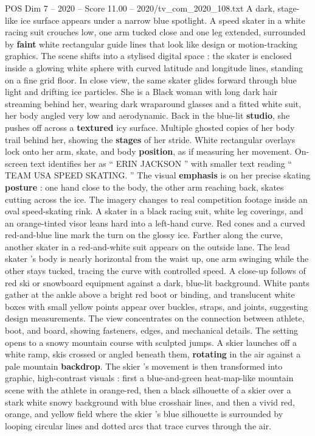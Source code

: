 \begin{textsample}{POS Dim 7 – 2020 – Score 11.00 – 2020/tv\_com\_2020\_108.txt}  \label{ex:f7_pos_081}
A dark, stage-like ice surface appears under a narrow blue spotlight.
A speed skater in a white racing suit crouches low, one arm tucked close and one leg extended, surrounded by \textbf{faint} white rectangular guide lines that look like design or motion-tracking graphics.
The scene shifts into a stylised digital space : the skater is enclosed inside a glowing white sphere with curved latitude and longitude lines, standing on a fine grid floor.
In close view, the same skater glides forward through blue light and drifting ice particles.
She is a Black woman with long dark hair streaming behind her, wearing dark wraparound glasses and a fitted white suit, her body angled very low and aerodynamic.
Back in the blue-lit \textbf{studio}, she pushes off across a \textbf{textured} icy surface.
Multiple ghosted copies of her body trail behind her, showing the \textbf{stages} of her stride.
White rectangular overlays lock onto her arm, skate, and body \textbf{position}, as if measuring her movement.
On-screen text identifies her as “ ERIN JACKSON ” with smaller text reading “ TEAM USA SPEED SKATING. ” The visual \textbf{emphasis} is on her precise skating \textbf{posture} : one hand close to the body, the other arm reaching back, skates cutting across the ice.
The imagery changes to real competition footage inside an oval speed-skating rink.
A skater in a black racing suit, white leg coverings, and an orange-tinted visor leans hard into a left-hand curve.
Red cones and a curved red-and-blue line mark the turn on the glossy ice.
Farther along the curve, another skater in a red-and-white suit appears on the outside lane.
The lead skater ’s body is nearly horizontal from the waist up, one arm swinging while the other stays tucked, tracing the curve with controlled speed.
A close-up follows of red ski or snowboard equipment against a dark, blue-lit background.
White pants gather at the ankle above a bright red boot or binding, and translucent white boxes with small yellow points appear over buckles, straps, and joints, suggesting design measurements.
The view concentrates on the connection between athlete, boot, and board, showing fasteners, edges, and mechanical details.
The setting opens to a snowy mountain course with sculpted jumps.
A skier launches off a white ramp, skis crossed or angled beneath them, \textbf{rotating} in the air against a pale mountain \textbf{backdrop}.
The skier ’s movement is then transformed into graphic, high-contrast visuals : first a blue-and-green heat-map-like mountain scene with the athlete in orange-red, then a black silhouette of a skier over a stark white snowy background with blue crosshair lines, and then a vivid red, orange, and yellow field where the skier ’s blue silhouette is surrounded by looping circular lines and dotted arcs that trace curves through the air.

\end{textsample}
